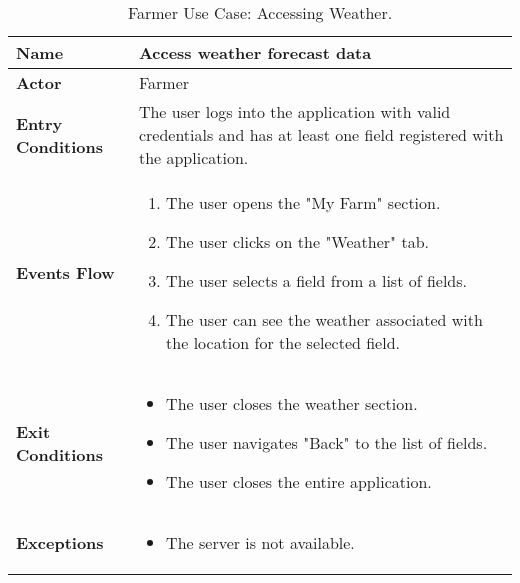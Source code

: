 \begin{table}[hbt!]
\centering
\small
\caption{\label{tab:farmerWeather}Farmer Use Case: Accessing Weather.}
\renewcommand{\arraystretch}{1.25}
\begin{tabular}{|l|>{\raggedright\arraybackslash}m{12cm}|}
    \hline
    \textbf{Name} & Access weather forecast data\\
    \hline
   	\textbf{Actor} & Farmer\\
    \hline
    \textbf{Entry Conditions} & The user logs into the application with valid credentials and has at least one field registered with the application.\\
    \hline
    
    \textbf{Events Flow} & \begin{enumerate}
    			\item The user opens the "My Farm" section.
    			\item The user clicks on the "Weather" tab.
    			\item The user selects a field from a list of fields.
    			\item The user can see the weather associated with the location for the selected field.
	    		\end{enumerate}
    	\\
    \hline
    \textbf{Exit Conditions} & \begin{itemize}
    	\item The user closes the weather section.
    	\item The user navigates "Back" to the list of fields.
   		\item The user closes the entire application.
   		\end{itemize} \\
    \hline
    \textbf{Exceptions} &
    		\begin{itemize}
    			\item The server is not available.
    		\end{itemize}
    \\
    \hline
\end{tabular}
\end{table}